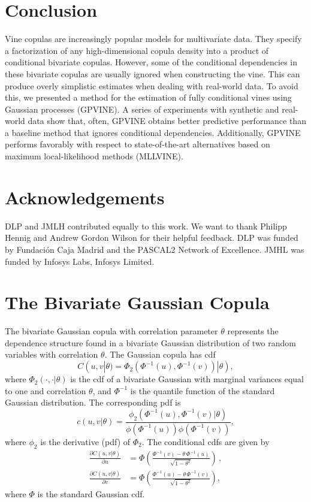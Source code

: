 \documentclass{article}
\begin{document}
\section{Conclusion}\label{sec:conclusions}
Vine copulas are increasingly popular models for multivariate data. They 
specify a factorization of any high-dimensional copula density into a product of
conditional bivariate copulas. However, some of the conditional dependencies in
these bivariate copulas are usually ignored when constructing the vine. This
can produce overly simplistic estimates when dealing with real-world data. To
avoid this, we presented a method for the estimation of fully conditional
vines using Gaussian processes (GPVINE). A series of experiments with synthetic
and real-world data show that, often, GPVINE obtains better
predictive performance than a baseline method that ignores conditional
dependencies. Additionally, GPVINE performs favorably
with respect to state-of-the-art alternatives based on maximum local-likelihood
methods (MLLVINE).

\section*{Acknowledgements}

DLP and JMLH contributed equally to this work. We want to thank Philipp Hennig
and Andrew Gordon Wilson for their helpful feedback. DLP was funded by
Fundaci\'on Caja Madrid and the PASCAL2 Network of Excellence. JMHL was funded
by Infosys Labs, Infosys Limited. 

\appendix

\section{The Bivariate Gaussian Copula}\label{appendix:gaussiancop}
The bivariate Gaussian copula with correlation parameter $\theta$ represents
the dependence structure found in a bivariate Gaussian distribution of two
random variables with correlation $\theta$. The Gaussian copula has cdf
\begin{equation}
  C(u,v| \theta) = \Phi_2(\Phi^{-1}(u),\Phi^{-1}(v))| \theta),
  \end{equation}
where $\Phi_2(\cdot,\cdot|\theta)$ is the cdf of a bivariate Gaussian with
marginal variances equal to one and correlation $\theta$, and $\Phi^{-1}$ is the
quantile function of the standard Gaussian distribution.  The corresponding pdf
is
\begin{equation}
  c(u,v| \theta) = \frac{\phi_2(\Phi^{-1}(u),
  \Phi^{-1}(v)|\theta)}{\phi(\Phi^{-1}(u))\phi(\Phi^{-1}(v))},
\end{equation}
where $\phi_2$ is the derivative (pdf) of $\Phi_2$. The conditional cdfs are
given by
\begin{align}
  \frac{\partial C(u,v| \theta)}{\partial u}  &=
  \Phi\left(\frac{\Phi^{-1}(v) - \theta \, \Phi^{-1}(u)}{\sqrt{1-\theta^2}}\right)\,, \\
  \frac{\partial C(u,v| \theta)}{\partial v}  &=
  \Phi\left(\frac{\Phi^{-1}(u) - \theta \, \Phi^{-1}(v)}{\sqrt{1-\theta^2}}\right),
\end{align}
where $\Phi$ is the standard Gaussian cdf.

\clearpage
\newpage


\end{document}
